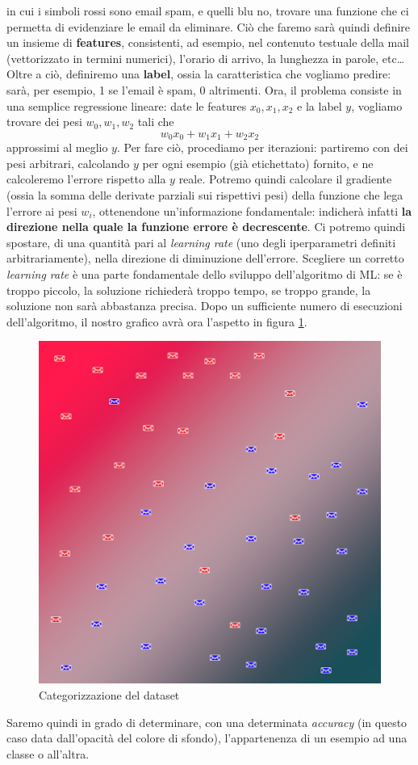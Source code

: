 in cui i simboli rossi sono email spam, e quelli blu no, trovare una funzione che ci permetta di evidenziare le email da eliminare. Ciò che faremo sarà quindi definire un insieme di \textbf{features}, consistenti, ad esempio, nel contenuto testuale della mail (vettorizzato in termini numerici), l'orario di arrivo, la lunghezza in parole, etc\dots Oltre a ciò, definiremo una \textbf{label}, ossia la caratteristica che vogliamo predire: sarà, per esempio, 1 se l'email è spam, 0 altrimenti. Ora, il problema consiste in una semplice regressione lineare: date le features $x_0, x_1, x_2$ e la label $y$, vogliamo trovare dei pesi $w_0, w_1, w_2$ tali che
\begin{displaymath}
    w_0x_0+w_1x_1+w_2x_2
\end{displaymath}
approssimi al meglio $y$. Per fare ciò, procediamo per iterazioni: partiremo con dei pesi arbitrari, calcolando $y$ per ogni esempio (già etichettato) fornito, e ne calcoleremo l'errore rispetto alla $y$ reale. Potremo quindi calcolare il gradiente (ossia la somma delle derivate parziali sui rispettivi pesi) della funzione che lega l'errore ai pesi $w_i$, ottenendone un'informazione fondamentale: indicherà infatti \textbf{la direzione nella quale la funzione errore è decrescente}. Ci potremo quindi spostare, di una quantità pari al \textit{learning rate} (uno degli iperparametri definiti arbitrariamente), nella direzione di diminuzione dell'errore. Scegliere un corretto \textit{learning rate} è una parte fondamentale dello sviluppo dell'algoritmo di ML: se è troppo piccolo, la soluzione richiederà troppo tempo, se troppo grande, la soluzione non sarà abbastanza precisa. Dopo un sufficiente numero di esecuzioni dell'algoritmo, il nostro grafico avrà ora l'aspetto in figura \ref{fig:categorized-spam}.
\begin{figure}[H]
    \begin{center}
        \includegraphics[width=0.8\columnwidth]{images/stateofart/categorized-spam.png}
    \end{center}
    \caption{Categorizzazione del dataset}
    \label{fig:categorized-spam}
\end{figure}
Saremo quindi in grado di determinare, con una determinata \textit{accuracy} (in questo caso data dall'opacità del colore di sfondo), l'appartenenza di un esempio ad una classe o all'altra.
